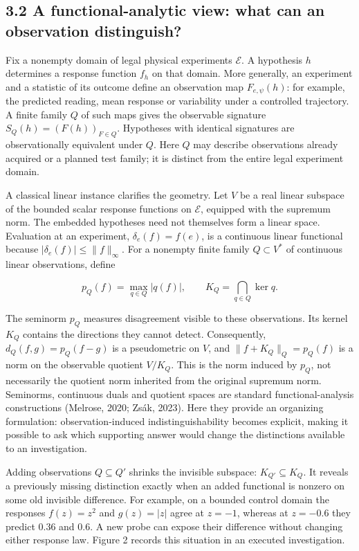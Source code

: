 \documentclass[11pt,a4paper]{article}
\begin{document}
\subsection*{3.2 A functional-analytic view: what can an observation distinguish?}

Fix a nonempty domain of legal physical experiments \(\mathcal E\). A hypothesis \(h\) determines a response function \(f_h\) on that domain. More generally, an experiment and a statistic of its outcome define an observation map \(F_{e,\psi}(h)\): for example, the predicted reading, mean response or variability under a controlled trajectory. A finite family \(Q\) of such maps gives the observable signature \(S_Q(h)=(F(h))_{F\in Q}\). Hypotheses with identical signatures are observationally equivalent under \(Q\). Here \(Q\) may describe observations already acquired or a planned test family; it is distinct from the entire legal experiment domain.


A classical linear instance clarifies the geometry. Let \(V\) be a real linear subspace of the bounded scalar response functions on \(\mathcal E\), equipped with the supremum norm. The embedded hypotheses need not themselves form a linear space. Evaluation at an experiment, \(\delta_e(f)=f(e)\), is a continuous linear functional because \(|\delta_e(f)|\leq\|f\|_\infty\). For a nonempty finite family \(Q\subset V^*\) of continuous linear observations, define


\[
p_Q(f)=\max_{q\in Q}|q(f)|,\qquad
K_Q=\bigcap_{q\in Q}\ker q.
\]


The seminorm \(p_Q\) measures disagreement visible to these observations. Its kernel \(K_Q\) contains the directions they cannot detect. Consequently, \(d_Q(f,g)=p_Q(f-g)\) is a pseudometric on \(V\), and \(\|f+K_Q\|_Q=p_Q(f)\) is a norm on the observable quotient \(V/K_Q\). This is the norm induced by \(p_Q\), not necessarily the quotient norm inherited from the original supremum norm. Seminorms, continuous duals and quotient spaces are standard functional-analysis constructions (Melrose, 2020; Zsák, 2023). Here they provide an organizing formulation: observation-induced indistinguishability becomes explicit, making it possible to ask which supporting answer would change the distinctions available to an investigation.


Adding observations \(Q\subseteq Q'\) shrinks the invisible subspace: \(K_{Q'}\subseteq K_Q\). It reveals a previously missing distinction exactly when an added functional is nonzero on some old invisible difference. For example, on a bounded control domain the responses \(f(z)=z^2\) and \(g(z)=|z|\) agree at \(z=-1\), whereas at \(z=-0.6\) they predict \(0.36\) and \(0.6\). A new probe can expose their difference without changing either response law. Figure 2 records this situation in an executed investigation.
\end{document}
